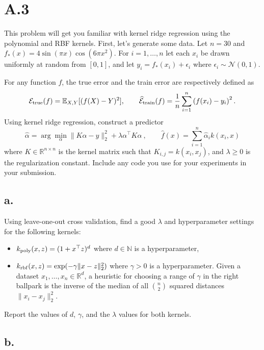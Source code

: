 \documentclass{article}
\newcommand{\field}[1]{\mathbb{#1}}
\newcommand{\1}{\mathbf{1}}
\newcommand{\E}{\mathbb{E}}
\newcommand{\R}{\field{R}} %
\newcommand{\twonorm}[1]{\|#1\|_2^2}
\begin{document}
\section*{A.3}
{\Large 


This problem will get you familiar with kernel ridge regression using the polynomial and RBF kernels.
First, let's generate some data. Let $n=30$ and $f_*(x) = 4 \sin(\pi x)\cos(6\pi x^2)$. For $i=1,\dots,n$ let each $x_i$ be drawn uniformly at random from $[0,1]$, and let $y_i = f_*(x_i) + \epsilon_i$ where $\epsilon_i \sim \mathcal{N}(0,1)$.

For any function $f$, the true error and the train error are respectively defined as
\begin{align*}
    \mathcal{E}_{\rm true}(f) = \E_{X,Y}[ ( f(X) - Y)^2], \quad \quad  \widehat{\mathcal{E}}_{\rm train}(f) =  \frac{1}{n} \sum_{i=1}^n \left(f(x_i)-y_i\right)^2.
\end{align*}
Using kernel ridge regression, construct a predictor
\[
  \widehat{\alpha} = \arg\min_\alpha \twonorm{K\alpha - y} + \lambda \alpha^\top K \alpha \ , \quad \quad \widehat{f}(x) = \sum_{i=1}^n \widehat{\alpha}_i k(x_i,x) 
\]
where $K\in\R^{n\times n}$ is the kernel matrix such that $K_{i,j} = k(x_i,x_j)$, and $\lambda\geq 0$ is the regularization constant. Include any code you use for your experiments in your submission.

\subsection*{a.}

Using leave-one-out cross validation, find a good $\lambda$ and hyperparameter settings for the following kernels:
  \begin{itemize}
    \item $k_{\rm poly}(x,z) = (1+x^\top z)^d$ where $d \in \mathbb{N}$ is a hyperparameter, 
    \item $k_{\rm rbf}(x,z) = \exp(-\gamma \twonorm{x-z})$ where $\gamma > 0$ is a hyperparameter. Given a dataset $x_1,\dots,x_n \in \R^d$, a heuristic for choosing a range of $\gamma$ in the right ballpark is the inverse of the median of all $\binom{n}{2}$ squared distances $\twonorm{x_i-x_j}$.
  \end{itemize} 
Report the values of $d$, $\gamma$, and the $\lambda$ values for both kernels.

\subsection*{b.}

}
\end{document}
